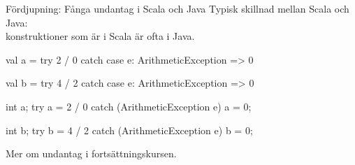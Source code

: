 \begin{Slide}{Fördjupning: Fånga undantag i Scala och Java}
Typisk skillnad mellan Scala och Java:\\konstruktioner som är  i Scala är ofta  i Java.
\begin{multicols}{2}
\begin{CodeSmall}[basicstyle=\ttfamily\SlideFontSize{6}{8}]
val a = try { 2 / 0 } catch {
  case e: ArithmeticException => 0
}

val b = try { 4 / 2 } catch {
  case e: ArithmeticException => 0
}
\end{CodeSmall}

\columnbreak

\begin{CodeSmall}[language=Java,basicstyle=\ttfamily\SlideFontSize{6}{8}]
int a;
try {
    a = 2 / 0
} catch (ArithmeticException e) {
    a = 0;
}

int b;
try {
    b = 4 / 2
} catch (ArithmeticException e) {
    b = 0;
}

\end{CodeSmall}
\end{multicols}

Mer om undantag  i fortsättningskursen.
\end{Slide}




